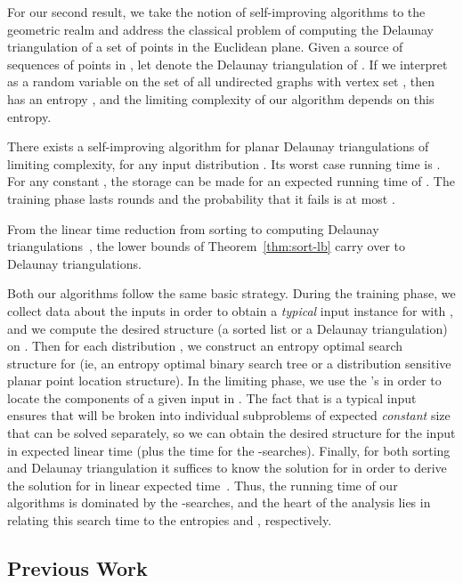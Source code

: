 \documentclass{siamltex}
\begin{document}
For our second result, we take the notion of self-improving algorithms
to the geometric realm and address the classical
problem of computing the Delaunay triangulation
of a set of points in the Euclidean plane.
Given a source  of sequences 
 of points in ,
let  denote the Delaunay triangulation of .
If we interpret  as a random variable on the set of 
all undirected graphs with vertex set ,
then  has an entropy , and
the limiting complexity of our algorithm depends on this entropy.
\medskip
\begin{theorem} \label{thm:del}
There exists a self-improving algorithm for planar Delaunay triangulations
of  limiting complexity, for any input distribution 
. 
Its worst case running time is .
For any constant , the storage can be made  for
an expected running time of .
The training phase lasts  rounds and the probability
that it fails is at most .
\end{theorem}
\medskip

From the linear time reduction from sorting to computing Delaunay 
triangulations~\cite[Theorems~8.2.2 and 12.1.1]{BoissonnatYv98}, 
the lower bounds of Theorem~\ref{thm:sort-lb} 
carry over to Delaunay triangulations. 

Both our algorithms follow the same basic strategy. 
During the training phase, we collect data about the inputs in 
order to obtain a \emph{typical}
input instance  for  with , and we 
compute the desired structure  (a sorted list or a Delaunay
triangulation) on .
Then for each distribution , we construct an entropy
optimal search structure  for  (ie, an entropy optimal
binary search tree or a distribution sensitive planar point location 
structure).  In the
limiting phase, we use the 's in order to locate the
components of a given input  in .
The fact that  is a typical input ensures that  will
be broken into individual subproblems of expected \emph{constant} size
that can be solved separately, so we can obtain the desired
structure for the input  in expected linear time 
(plus the time for the -searches). Finally, for 
both sorting and Delaunay triangulation it suffices to know
the solution for  in order to derive the solution for
 in linear expected time~\cite{CDH+,ChazelleMu09}. Thus, the running time 
of our algorithms
is dominated by the -searches, and the heart of the analysis
lies in relating this search time to the entropies  and
, respectively. 

\subsection{Previous Work}
\end{document}
